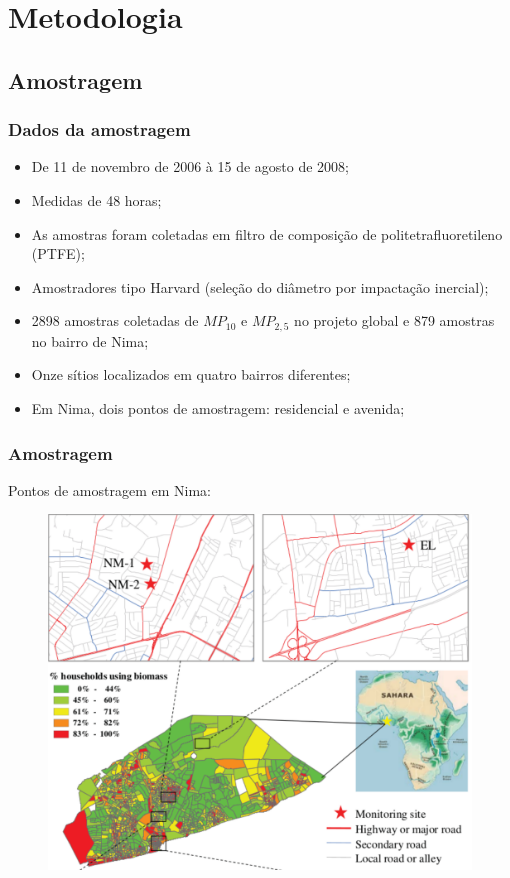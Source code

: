 \section{Metodologia}

\subsection{Amostragem}
\begin{frame}
	\frametitle{Dados da amostragem}
	\begin{itemize}
		\item De 11 de novembro de 2006 à 15 de agosto de 2008;
		\item Medidas de 48 horas;
		\item As amostras foram coletadas em filtro de composição de politetrafluoretileno
		(PTFE);
		\item Amostradores tipo Harvard (seleção do diâmetro por impactação inercial);
		\item 2898 amostras coletadas de $MP_{10}$ e $MP_{2,5}$ no projeto global e 879 amostras no bairro de Nima;
		\item Onze sítios localizados em quatro bairros diferentes;
		\item Em Nima, dois pontos de amostragem: residencial e avenida;
	\end{itemize}
\end{frame}

\begin{frame}
  \frametitle{Amostragem}
 \begin{center}
  Pontos de amostragem em Nima:
 \end{center}
  \begin{figure}[H]
    \centering
    \includegraphics[scale=0.35]{../../inputs/images/zheng/nima_mapa.pdf}
  \end{figure}
\end{frame}

